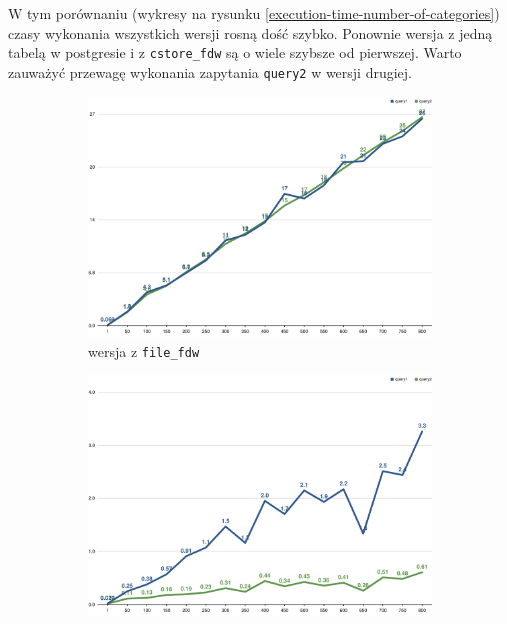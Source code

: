 \documentclass[a4paper,11pt]{article}
\begin{document}
W tym porównaniu (wykresy na rysunku \ref{execution-time-number-of-categories}) czasy wykonania wszystkich wersji
rosną dość szybko. Ponownie wersja z jedną tabelą w postgresie i z \texttt{cstore\_fdw} są o wiele szybsze
od pierwszej. Warto zauważyć przewagę wykonania zapytania \texttt{query2} w wersji drugiej.
\begin{figure}[h!]
    \centering
    \begin{subfigure}{.49\textwidth}
        \centering
        \includegraphics[width=\textwidth]{charts/execution-time-file-fdw-number_of_categories}
        \caption{wersja z \texttt{file\_fdw}}
    \end{subfigure}
    \hfill
    \begin{subfigure}{.49\textwidth}
        \centering
        \includegraphics[width=\textwidth]{charts/execution-time-sql-one-table-number_of_categories}

\end{subfigure}
\end{figure}
\end{document}
